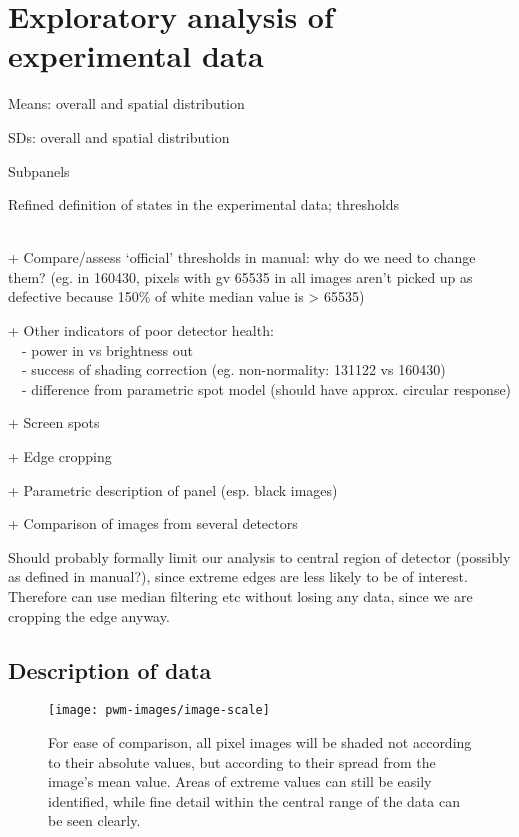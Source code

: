 \documentclass[\main/IO-Pixels.tex]{subfiles}
\begin{document}
\section{Exploratory analysis of experimental data}
\begin{outline}
Means: overall and spatial distribution

SDs: overall and spatial distribution

Subpanels

Refined definition of states in the experimental data; thresholds

\\
+ Compare/assess `official' thresholds in manual: why do we need to change them? (eg. in 160430, pixels with gv 65535 in all images aren't picked up as defective because 150\% of white median value is > 65535) 

+ Other indicators of poor detector health: \\ \-\  \-\ - power in vs brightness out \\ \-\  \-\ - success of shading correction (eg. non-normality: 131122 vs 160430) \\\-\  \-\ - difference from parametric spot model (should have approx. circular response)

+ Screen spots

+ Edge cropping

+ Parametric description of panel (esp. black images)

+ Comparison of images from several detectors
\end{outline}

Should probably formally limit our analysis to central region of detector (possibly as defined in manual?), since extreme edges are less likely to be of interest. Therefore can use median filtering etc without losing any data, since we are cropping the edge anyway.

\subsection{Description of data}


\begin{figure}
\caption{For ease of comparison, all pixel images will be shaded not according to their absolute values, but according to their spread from the image's mean value. Areas of extreme values can still be easily identified, while fine detail within the central range of the data can be seen clearly.}

    \texttt{[image: pwm-images/image-scale]}

\end{figure}
\end{document}

